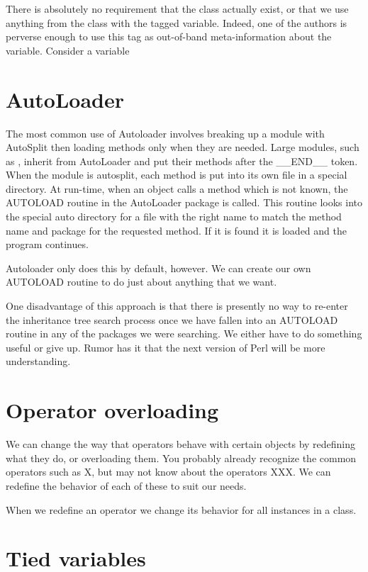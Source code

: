 There is absolutely no requirement that the class actually exist,
or that we use anything from the class with the tagged variable.
Indeed, one of the authors is perverse enough to use this tag
as out-of-band meta-information about the variable.  Consider
a variable

    \section{AutoLoader}

The most common use of Autoloader involves breaking up a module
with AutoSplit then loading methods only when they are needed. 
Large modules, such as , inherit from AutoLoader and put
their methods after the \_\_END\_\_ token.  When the module is
autosplit, each method is put into its own file in a special
directory.  At run-time, when an object calls a method which is
not known, the AUTOLOAD routine in the AutoLoader package is
called.  This routine looks into the special auto directory for
a file with the right name to match the method name and package
for the requested method.  If it is found it is loaded and the
program continues.

Autoloader only does this by default, however.  We can create our
own AUTOLOAD routine to do just about anything that we want.

One disadvantage of this approach is that there is presently no
way to re-enter the inheritance tree search process once we
have fallen into an AUTOLOAD routine in any of the packages we
were searching.  We either have to do something useful or give
up.  Rumor has it that the next version of Perl will be more
understanding.


    \section{Operator overloading}

We can change the way that operators behave with certain objects
by redefining what they do, or overloading them.  You probably
already recognize the common operators such as X, but may not
know about the operators XXX.  We can redefine the behavior
of each of these to suit our needs.


When we redefine an operator we change its behavior for all
instances in a class.  


    \section{Tied variables}

